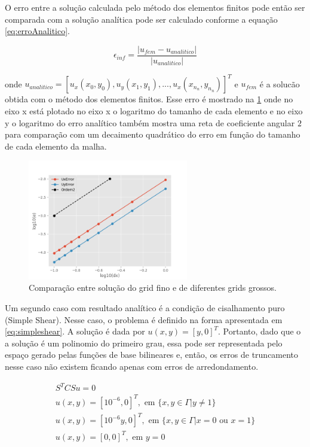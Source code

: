 O erro entre a solução calculada pelo método dos elementos finitos pode então ser comparada
com a solução analítica pode ser calculado conforme a equação \ref{eq:erroAnalitico}.

\begin{equation} \label{eq:erroAnalitico}
    \epsilon_{inf} =\frac{|u_{fem} - u_{analitico}|}{|u_{analitico}|}
\end{equation}

onde $u_{analitico} = [u_x(x_0, y_0), u_y(x_1, y_1), ..., u_x(x_{n_n}, y_{n_n})]^T$ e $u_{fem}$ é a solucão obtida com o método dos elementos finitos. Esse erro é mostrado na \ref{fig:SecondOrderTest} onde no eixo x 
está plotado no eixo x o logaritmo do tamanho de cada elemento e no eixo y o logaritmo do erro analítico também mostra uma reta de coeficiente angular $2$ para comparação com um decaimento
quadrático do erro em função do tamanho de cada elemento da malha.

\begin{figure}[!htbp]
    \label{fig:SecondOrderTest}
    \centering
    \includegraphics[width=7cm]{chap08/figs/SecondErrorTest.png}
    \caption{Comparação entre solução do grid fino e de diferentes grids grossos.}
\end{figure}
    
Um segundo caso com resultado analítico é a condição de cisalhamento puro (Simple Shear). 
Nesse caso, o problema é definido na forma apresentada em \ref{eq:simpleshear}. A solução
é dada por $u(x,y) = [y, 0]^T$. Portanto, dado que o a solução é um polinomio do primeiro grau,
essa pode ser representada pelo espaço gerado pelas funções de base bilineares e, então,
os erros de truncamento nesse caso não existem ficando apenas com erros de arredondamento.

\begin{equation}\label{eq:simpleshear}
    \begin{aligned}
        S^T C S u = 0 \\
        u(x,y) = [10^{-6}, 0]^T, \text{ em } \{x, y \in \Gamma | y \neq 1\} \\
        u(x,y) = [10^{-6}y, 0]^T, \text{ em } \{x, y \in \Gamma | x = 0 \text{ ou } x = 1\} \\
        u(x,y) = [0, 0]^T, \text{ em } y=0
    \end{aligned}
\end{equation}

